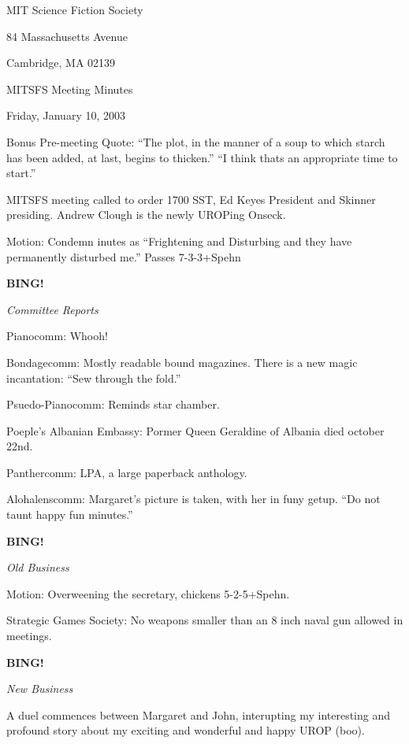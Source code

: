 \documentclass[12pt]{article}
\newcommand{\bing}{{\bf BING!} }
\newcommand{\goto}[1]{\bing \vskip 12pt \centerline{{\em{#1}}}}
\begin{document}
\begin{center}

MIT Science Fiction Society 

84 Massachusetts Avenue

Cambridge, MA 02139

\vspace{12pt}

MITSFS Meeting Minutes 

Friday, January 10, 2003

\end{center}
 
\vspace{18pt}

\setlength{\parskip}{6pt}

\noindent

Bonus Pre-meeting Quote:  ``The plot, in the manner of a soup to which starch has been added, at last, begins to thicken.''  ``I think thats an appropriate time to start.''

MITSFS meeting called to order 1700 SST, Ed Keyes President and Skinner presiding.  Andrew Clough is the newly UROPing Onseck.

Motion:  Condemn inutes as ``Frightening and Disturbing and they have permanently disturbed me.'' Passes 7-3-3+Spehn

\goto{Committee Reports}

Pianocomm:  Whooh!

Bondagecomm:  Mostly readable bound magazines.  There is a new magic incantation: ``Sew through the fold.''

Psuedo-Pianocomm:  Reminds star chamber.

Poeple's Albanian Embassy:  Pormer Queen Geraldine of Albania died october 22nd.

Panthercomm: LPA, a large paperback anthology.

Alohalenscomm:  Margaret's picture is taken, with her in funy getup.  ``Do not taunt happy fun minutes.''


\goto{Old Business}

Motion:  Overweening the secretary, chickens 5-2-5+Spehn.

Strategic Games Society:  No weapons smaller than an 8 inch naval gun allowed in meetings.

\goto{New Business}

A duel commences between Margaret and John, interupting my interesting and profound story about my exciting and wonderful and happy UROP (boo).
\end{document}
